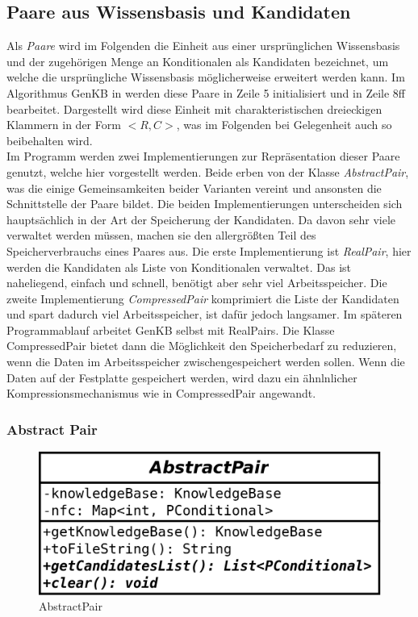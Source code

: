 \documentclass[12pt,a4paper]{article}
\begin{document}
\subsection{Paare aus Wissensbasis und Kandidaten}
Als \textit{Paare} wird im Folgenden die Einheit aus einer ursprünglichen Wissensbasis und der zugehörigen Menge an Konditionalen als Kandidaten bezeichnet, um welche die ursprüngliche Wissensbasis möglicherweise erweitert werden kann. Im Algorithmus GenKB in \cite{beierle19} werden diese Paare in Zeile 5 initialisiert und in Zeile 8ff bearbeitet. Dargestellt wird diese Einheit mit charakteristischen dreieckigen Klammern in der Form $<R, C>$, was im Folgenden bei Gelegenheit auch so beibehalten wird. \\
Im Programm werden zwei Implementierungen zur Repräsentation dieser Paare genutzt, welche hier vorgestellt werden. Beide erben von  der Klasse \textit{AbstractPair}, was die einige Gemeinsamkeiten beider Varianten vereint und ansonsten die Schnittstelle der Paare bildet. Die beiden Implementierungen unterscheiden sich hauptsächlich in der Art der Speicherung der Kandidaten. Da davon sehr viele verwaltet werden müssen, machen sie den allergrößten Teil des Speicherverbrauchs eines Paares aus. Die erste Implementierung ist \textit{RealPair}, hier werden die Kandidaten als Liste von Konditionalen verwaltet. Das ist naheliegend, einfach und schnell, benötigt aber sehr viel Arbeitsspeicher. Die zweite Implementierung \textit{CompressedPair} komprimiert die Liste der Kandidaten und spart dadurch viel Arbeitsspeicher, ist dafür jedoch langsamer. Im späteren Programmablauf arbeitet GenKB selbst mit RealPairs. Die Klasse CompressedPair bietet dann die Möglichkeit den Speicherbedarf zu reduzieren, wenn die Daten im Arbeitsspeicher zwischengespeichert werden sollen. Wenn die Daten auf der Festplatte gespeichert werden, wird dazu ein ähnlnlicher Kompressionsmechanismus wie in CompressedPair angewandt.




\subsubsection{Abstract Pair}
\label{sec:abstractpair}

\begin{figure}
\includegraphics[width=0.45\linewidth]{bilder/AbstractPair.png}
\caption{AbstractPair}
\label{pic:abstractpair}
\end{figure}
\end{document}
